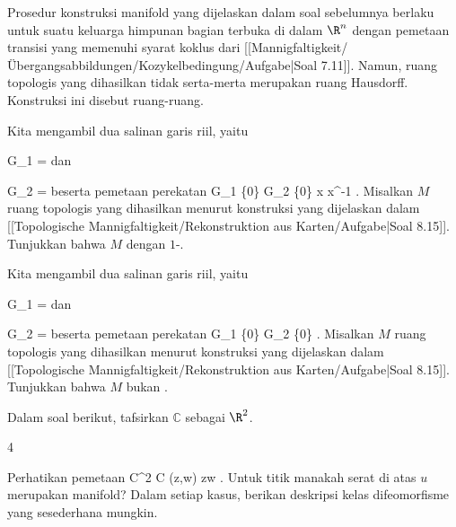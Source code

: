 Prosedur konstruksi manifold yang dijelaskan dalam soal sebelumnya berlaku untuk suatu keluarga himpunan bagian terbuka di dalam $\R^n$ dengan pemetaan transisi yang memenuhi syarat koklus dari
[[Mannigfaltigkeit/Übergangsabbildungen/Kozykelbedingung/Aufgabe|Soal 7.11]].
Namun, ruang topologis yang dihasilkan tidak serta-merta merupakan ruang Hausdorff. Konstruksi ini disebut  {} ruang-ruang.

{}
{

Kita mengambil dua salinan garis riil, yaitu

\mavergleichskette
{\vergleichskette
{G_1
}
{ = }{\R
}
{  }{
}
{    }{
}
{   }{
}
}
{}{}{}
dan

\mavergleichskette
{\vergleichskette
{G_2
}
{ = }{\R
}
{  }{
}
{    }{
}
{   }{
}
}
{}{}{}
beserta pemetaan perekatan
\maabbeledisp {\varphi} {G_1 \setminus \{0\} } { G_2 \setminus \{0\}
} { x } { x^{-1}
} {.}
Misalkan $M$ ruang topologis yang dihasilkan menurut konstruksi yang dijelaskan dalam
[[Topologische Mannigfaltigkeit/Rekonstruktion aus Karten/Aufgabe|Soal 8.15]].
Tunjukkan bahwa $M$
dengan
$1$-.

}
{} {}

{}
{

Kita mengambil dua salinan garis riil, yaitu

\mavergleichskette
{\vergleichskette
{G_1
}
{ = }{\R
}
{  }{
}
{    }{
}
{   }{
}
}
{}{}{}
dan

\mavergleichskette
{\vergleichskette
{G_2
}
{ = }{\R
}
{  }{
}
{    }{
}
{   }{
}
}
{}{}{}
beserta pemetaan perekatan
 {G_1 \setminus \{0\} } { G_2 \setminus \{0\}
} {.}
Misalkan $M$ ruang topologis yang dihasilkan menurut konstruksi yang dijelaskan dalam
[[Topologische Mannigfaltigkeit/Rekonstruktion aus Karten/Aufgabe|Soal 8.15]].
Tunjukkan bahwa $M$ bukan
.

}
{} {}


Dalam soal berikut, tafsirkan ${\mathbb C}$ sebagai $\R^2$.

{4}
{

Perhatikan pemetaan
\maabbeledisp {} { {\mathbb C}^2} { {\mathbb C}
} {(z,w)} { zw
} {.}
Untuk titik manakah
 serat di atas $u$ merupakan manifold? Dalam setiap kasus, berikan deskripsi kelas difeomorfisme yang sesederhana mungkin.

}
{} {}

